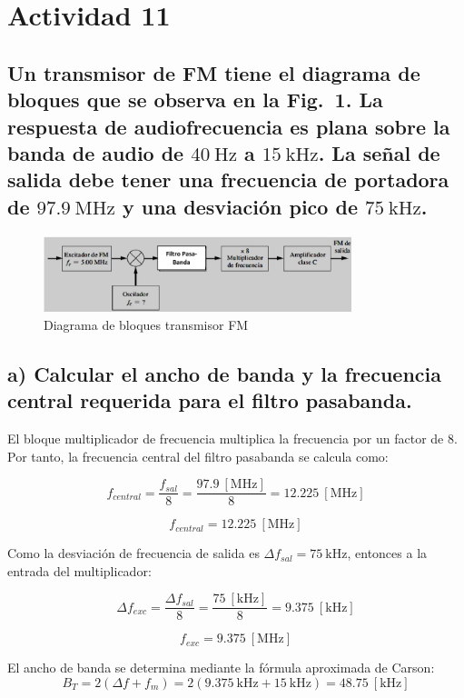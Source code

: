 \section{Actividad 11}

\subsection*{Un transmisor de FM tiene el diagrama de bloques que se observa en la Fig.~1. La respuesta de audiofrecuencia es plana sobre la banda de audio de 
$40~\text{Hz}$ a $15~\text{kHz}$. La señal de salida debe tener una frecuencia de portadora de $97.9~\text{MHz}$ y una desviación pico de $75~\text{kHz}$.}

\begin{figure}[h!]
    \centering
    \includegraphics[width=0.8\textwidth]{imagenes/Parte_2/Actividad_11/fig4.png}
    \caption{Diagrama de bloques transmisor FM}
    \label{fig:4}
\end{figure}


\subsection*{a) Calcular el ancho de banda y la frecuencia central requerida para el filtro pasabanda.} 

El bloque multiplicador de frecuencia multiplica la frecuencia por un factor de 8.  
Por tanto, la frecuencia central del filtro pasabanda se calcula como:

    \[
        f_{central} = \frac{f_{sal}}{8} = \frac{97.9~[\text{MHz}]}{8} = 12.225~[\text{MHz}]
    \]

    \[
        \boxed{f_{central} = 12.225~[\text{MHz}]}
    \]

Como la desviación de frecuencia de salida es \(\Delta f_{sal} = 75~\text{kHz}\), entonces a la entrada del multiplicador:

    \[
        \Delta f_{exc} = \frac{\Delta f_{sal}}{8} = \frac{75~[\text{kHz}]}{8} = 9.375~[\text{kHz}]
    \]

    \[
        \boxed{f_{exc} = 9.375~[\text{MHz}]}
    \]

El ancho de banda se determina mediante la fórmula aproximada de Carson:
    \[
        B_T = 2(\Delta f + f_m) = 2(9.375~\text{kHz} + 15~\text{kHz}) = 48.75~[\text{kHz}]
    \]
    
